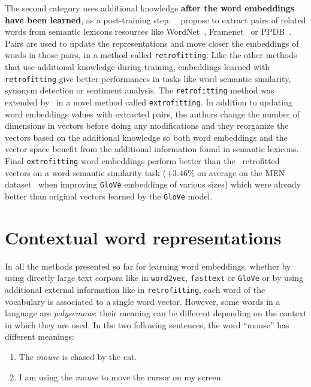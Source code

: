   The second category uses additional knowledge \textbf{after the word
  embeddings have been learned}, as a post-training step.
  \citeauthor{faruqui2015retrofitting}~\citep{faruqui2015retrofitting} propose
  to extract pairs of related words from semantic lexicons resources like
  WordNet~\citep{miller1995wordnet}, Framenet~\citep{baker1998berkeley} or
  PPDB~\citep{ganitkevitch2013ppdb}. Pairs are used to update the
  representations and move closer the embeddings of words in those pairs, in a
  method called \texttt{retrofitting}. Like the other methods that use
  additional knowledge during training, embeddings learned with
  \texttt{retrofitting} give better performances in tasks like word semantic
  similarity, synonym detection or sentiment analysis. The \texttt{retrofitting}
  method was extended by~\citet{jo2018extrofitting} in a novel method called
  \texttt{extrofitting}. In addition to updating word embeddings values with
  extracted pairs, the authors change the number of dimensions in vectors before
  doing any modifications and they reorganize the vectors based on the
  additional knowledge so both word embeddings and the vector space benefit from
  the additional information found in semantic lexicons. Final
  \texttt{extrofitting} word embeddings perform better than
  the~\citeauthor{faruqui2015retrofitting} retrofitted vectors on a word
  semantic similarity task ($+3.46\%$ on average on the MEN
  dataset~\citep{bruni2014multimodal} when improving \texttt{GloVe} embeddings
  of various sizes) which were already better than original vectors learned by
  the \texttt{GloVe} model.

\section{Contextual word representations}
  In all the methods presented so far for learning word embeddings, whether by
  using directly large text corpora like in \texttt{word2vec}, \texttt{fasttext}
  or \texttt{GloVe} or by using additional external information like in
  \texttt{retrofitting}, each word of the vocabulary is associated to a single
  word vector. However, some words in a language are \textit{polysemous}: their
  meaning can be different depending on the context in which they are used. In
  the two following sentences, the word ``mouse'' has different meanings:
  \begin{enumerate}
    \item The \textit{mouse} is chased by the cat.
    \item I am using the \textit{mouse} to move the cursor on my screen.
  \end{enumerate}

